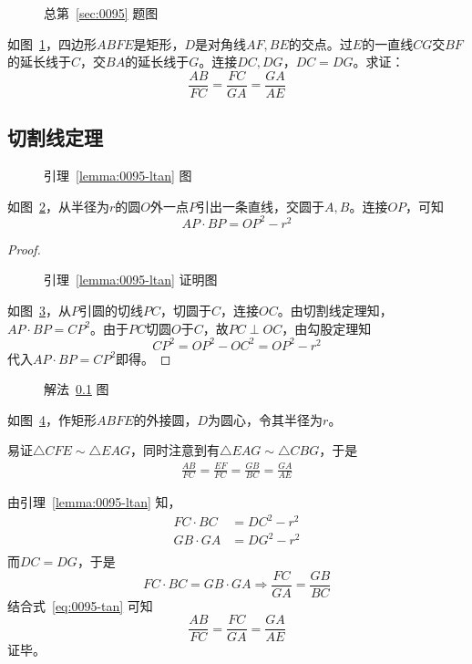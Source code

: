 

\begin{figure}[htbp]
  \centering
  \caption{总第~\ref{sec:0095} 题图} \label{fig:0095}
\end{figure}

如图~\ref{fig:0095}，四边形$ABFE$是矩形，$D$是对角线$AF, BE$的交点。过$E$的一直线$CG$交$BF$的延长线于$C$，交$BA$的延长线于$G$。连接$DC, DG$，$DC = DG$。求证：
\[ \frac{AB}{FC} = \frac{FC}{GA} = \frac{GA}{AE} \]

\subsection{切割线定理} \label{subsec:0095-tan}

\begin{lemma} \label{lemma:0095-ltan}
  \begin{figure}
    \centering
    \caption{引理~\ref{lemma:0095-ltan} 图}
    \label{fig:0095-ltan}
  \end{figure}
  如图~\ref{fig:0095-ltan}，从半径为$r$的圆$O$外一点$P$引出一条直线，交圆于$A, B$。连接$OP$，可知
  \[ AP \cdot BP = OP^2 - r^2 \]
\end{lemma}

\begin{proof}
  \begin{figure}
    \centering
    \caption{引理~\ref{lemma:0095-ltan} 证明图}
    \label{fig:0095-ltan-p}
  \end{figure}
  如图~\ref{fig:0095-ltan-p}，从$P$引圆的切线$PC$，切圆于$C$，连接$OC$。由切割线定理知，$AP \cdot BP = CP^2$。由于$PC$切圆$O$于$C$，故$PC \perp OC$，由勾股定理知
  \[ CP^2 = OP^2 - OC^2 = OP^2 - r^2 \]
  代入$AP \cdot BP = CP^2$即得。
\end{proof}

\begin{figure}[htbp]
  \centering
  \caption{解法~\ref{subsec:0095-tan} 图} \label{fig:0095-tan}
\end{figure}

如图~\ref{fig:0095-tan}，作矩形$ABFE$的外接圆，$D$为圆心，令其半径为$r$。

易证$\triangle CFE \sim \triangle EAG$，同时注意到有$\triangle EAG \sim \triangle CBG$，于是
\begin{align}
  \frac{AB}{FC} = \frac{EF}{FC} = \frac{GB}{BC} = \frac{GA}{AE} \label{eq:0095-tan}
\end{align}

由引理~\ref{lemma:0095-ltan} 知，
\begin{align*}
  FC \cdot BC &= DC^2 - r^2 \\
  GB \cdot GA &= DG^2 - r^2 \\
\end{align*}
而$DC = DG$，于是
\[ FC \cdot BC = GB \cdot GA \Rightarrow \frac{FC}{GA} = \frac{GB}{BC} \]
结合式~\ref{eq:0095-tan} 可知
\[ \frac{AB}{FC} = \frac{FC}{GA} = \frac{GA}{AE} \]
证毕。
